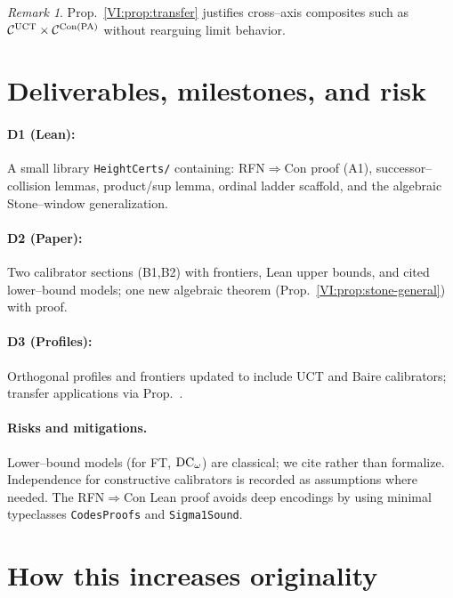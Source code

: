 \documentclass[11pt]{article}
\theoremstyle{definition}
\theoremstyle{remark}
\newtheorem{remark}[theorem]{Remark}
\begin{document}
\begin{remark}
Prop.~\ref{VI:prop:transfer} justifies cross–axis composites such as \(\mathcal C^{\mathrm{UCT}}\times \mathcal C^{\mathrm{Con}(\mathrm{PA})}\) without rearguing limit behavior.
\end{remark}

\section{Deliverables, milestones, and risk}

\paragraph{D1 (Lean):} A small library \texttt{HeightCerts/} containing:
RFN\(\Rightarrow\)Con proof (A1), successor–collision lemmas, product/sup lemma, ordinal ladder scaffold, and the algebraic Stone–window generalization.

\paragraph{D2 (Paper):} Two calibrator sections (B1,B2) with frontiers, Lean upper bounds, and cited lower–bound models; one new algebraic theorem (Prop.~\ref{VI:prop:stone-general}) with proof.

\paragraph{D3 (Profiles):} Orthogonal profiles and frontiers updated to include UCT and Baire calibrators; transfer applications via Prop.~.

\paragraph{Risks and mitigations.}
Lower–bound models (for FT, \(\mathrm{DC}_\omega\)) are classical; we cite rather than formalize. Independence for constructive calibrators is recorded as assumptions where needed. The RFN\(\Rightarrow\)Con Lean proof avoids deep encodings by using minimal typeclasses \texttt{CodesProofs} and \texttt{Sigma1Sound}.

\section{How this increases originality}
\end{document}
